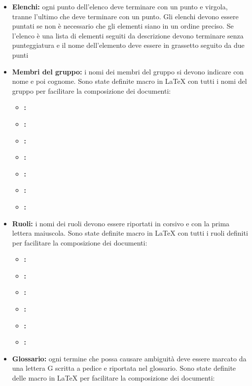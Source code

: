 \documentclass[12pt,a4paper]{article}
\begin{document}
\begin{itemize}
	\item \textbf{Elenchi:} ogni punto dell'elenco deve terminare con un punto e virgola, tranne l'ultimo che deve terminare con un punto. Gli elenchi devono essere puntati se non è necessario che gli elementi siano in un ordine preciso. Se l'elenco è una lista di elementi seguiti da descrizione devono terminare senza punteggiatura e il nome dell'elemento deve essere in grassetto seguito da due punti
	\item \textbf{Membri del gruppo:} i nomi dei membri del gruppo si devono indicare con nome e poi cognome. Sono state definite macro in \LaTeX{} con tutti i nomi del gruppo per facilitare la composizione dei documenti:
	\begin{itemize}
		\item \textbf{\AVI:} 
		\item \textbf{\AVE:} 
		\item \textbf{\NDC:} 
		\item \textbf{\IB:} 
		\item \textbf{\WS:} 
		\item \textbf{\TP:} 
		\item \textbf{\AB:} 
	\end{itemize}
	\item \textbf{Ruoli:} i nomi dei ruoli devono essere riportati in corsivo e con la prima lettera maiuscola. Sono state definite macro in \LaTeX{} con tutti i ruoli definiti per facilitare la composizione dei documenti:
	\begin{itemize}
		\item \textbf{\AM:} 
		\item \textbf{\AN:} 
		\item \textbf{\PG:} 
		\item \textbf{\PR:} 
		\item \textbf{\VR:} 
		\item \textbf{\RE:} 
	\end{itemize}
	\item \textbf{Glossario:} ogni termine che possa causare ambiguità deve essere marcato da una lettera G scritta a pedice e riportata nel glossario. Sono state definite delle macro in \LaTeX{} per facilitare la composizione dei documenti:

\end{itemize}
\end{document}
